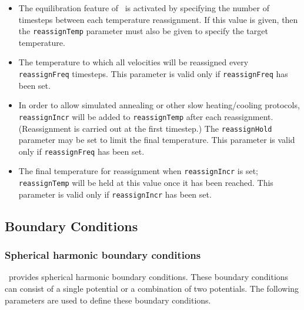 \begin{itemize}

\item
{}
{The equilibration feature of \PDAC\ is activated by 
specifying the number of timesteps between each temperature reassignment.
If this value is given, then the {\tt reassignTemp} parameter must also 
be given to specify the target temperature. }

\item
{}
{The temperature to which all velocities will be reassigned
every {\tt reassignFreq} timesteps.  
This parameter is valid only if {\tt reassignFreq} has been set.}

\item
{}
{In order to allow simulated annealing or other slow heating/cooling protocols, {\tt reassignIncr} will be added to {\tt reassignTemp} after each reassignment.
(Reassignment is carried out at the first timestep.)  The {\tt reassignHold} parameter may be set to limit the final temperature.
This parameter is valid only if {\tt reassignFreq} has been set.}

\item
{}
{The final temperature for reassignment when {\tt reassignIncr} is set; {\tt reassignTemp} will be held at this value once it has been reached.
This parameter is valid only if {\tt reassignIncr} has been set.}

\end{itemize}

\subsection{Boundary Conditions}

\subsubsection{Spherical harmonic boundary conditions}

\PDAC\ provides spherical harmonic boundary conditions.  These 
boundary conditions can consist of a single potential or a 
combination of two potentials.
The following parameters are used to define these boundary conditions.  

